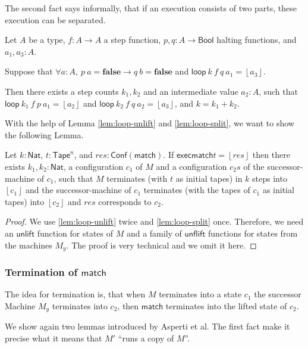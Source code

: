 \documentclass{psartcl}
\newcommand{\MS}[1]{\textsf{#1}}
\newcommand{\from}{:}
\renewcommand{\to}{\rightarrow}
\newcommand{\Bool}{\MS{Bool}}
\newcommand{\Nat}{\MS{Nat}}
\newcommand{\Some}[1]{\left\lfloor #1\right\rfloor}
\newcommand{\false}{\mathbf{false}}
\newcommand{\Tape}{\MS{Tape}}
\newcommand{\Tapes}[1]{\Tape^{#1}}
\begin{document}
The second fact says informally, that if an execution consists of two parts, these execution can be separated.

\begin{lemma}[Split $\MS{loop}$]
  \label{lem:loop-split}
  Let $A$ be a type, $f \from A \to A$ a step function, $p, q \from A \to \Bool$ halting functions, and $a_1, a_3:A$.

  Suppose that $\forall a:A,~p~a = \false \rightarrow q~b = \false$ and $\MS{loop}~k~f~q~a_1 = \Some{a_3}$.

  Then there exists a step counts $k_1, k_2$ and an intermediate value $a_2:A$, such that
  $\MS{loop}~k_1~f~p~a_1 = \Some{a_2}$ and $\MS{loop}~k_2~f~q~a_2 = \Some{a_3}$, and $k = k_1 + k_2$.
\end{lemma}

With the help of Lemma \ref{lem:loop-unlift} and \ref{lem:loop-split}, we want to show the following Lemma.
\begin{lemma}[Split $\MS{match}$]
  \label{lem:match-split}
  Let $k:\Nat$, $t:\Tapes{n}$, and $res:\MS{Conf}(\MS{match})$.
  If $\MS{exec} \MS{match} t = \Some{res}$ then
  there exists $k_1,k_2:\Nat$, a configuration $c_1$ of $M$ and a configuration $c_2s$ of the successor-machine of $c_1$,
  such that $M$ terminates (with $t$ as initial tapes) in $k$ steps into $\Some{c_1}$ and the successor-machine of $c_1$ terminates (with the tapes of
  $c_1$ as initial tapes) into $\Some{c_2}$ and $res$ corresponds to $c_2$.
\end{lemma}
\begin{proof}
  We use \ref{lem:loop-unlift} twice and \ref{lem:loop-split} once.  Therefore, we need an $\MS{unlift}$ function for states of $M$ and a family of
  $\MS{unflift}$ functions for states from the machines $M_y$.  The proof is very technical and we omit it here.
\end{proof}

\subsubsection{Termination of $\MS{match}$}

The idea for termination is, that when $M$ terminates into a state $c_1$ the successor Machine $M_y$ terminates into $c_2$, then $\MS{match}$
terminates into the lifted state of $c_2$.

We show again two lemmas introduced by Asperti et al.
The first fact make it precise what it means that $M'$ ``runs a copy of $M$''.
\end{document}
